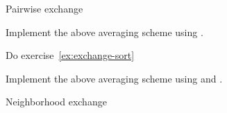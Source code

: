  {Pairwise exchange}

\begin{exercise}
  Implement the above averaging scheme using .
\end{exercise}

\begin{exercise}
  Do exercise~\ref{ex:exchange-sort}
\end{exercise}

\begin{exercise}
  Implement the above averaging scheme using  and .
\end{exercise}

 {Neighborhood exchange}


